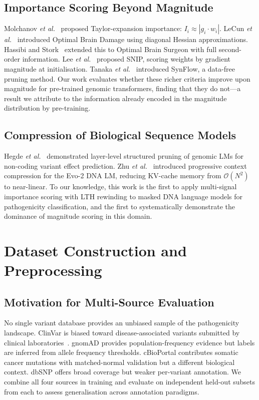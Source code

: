 \documentclass[journal]{IEEEtran}
\begin{document}
\subsection{Importance Scoring Beyond Magnitude}

Molchanov \emph{et al.}~\cite{Molchanov2017} proposed
Taylor-expansion importance: $I_i \approx |g_i \cdot w_i|$.
LeCun \emph{et al.}~\cite{LeCun1990} introduced Optimal Brain
Damage using diagonal Hessian approximations.
Hassibi and Stork~\cite{Hassibi1993} extended this to
Optimal Brain Surgeon with full second-order information.
Lee \emph{et al.}~\cite{Lee2019} proposed SNIP, scoring
weights by gradient magnitude at initialisation.
Tanaka \emph{et al.}~\cite{Tanaka2020} introduced SynFlow,
a data-free pruning method.
Our work evaluates whether these richer criteria improve upon
magnitude for pre-trained genomic transformers, finding that
they do not---a result we attribute to the information already
encoded in the magnitude distribution by pre-training.

\subsection{Compression of Biological Sequence Models}

Hegde \emph{et al.}~\cite{Hegde2025} demonstrated layer-level
structured pruning of genomic LMs for non-coding variant
effect prediction.
Zhu \emph{et al.}~\cite{Zhu2025} introduced progressive
context compression for the Evo-2 DNA LM, reducing KV-cache
memory from $\mathcal{O}(N^2)$ to near-linear.
To our knowledge, this work is the first to apply multi-signal
importance scoring with LTH rewinding to masked DNA language
models for pathogenicity classification, and the first to
systematically demonstrate the dominance of magnitude
scoring in this domain.


\section{Dataset Construction and Preprocessing}
\label{sec:data}

\subsection{Motivation for Multi-Source Evaluation}

No single variant database provides an unbiased sample of
the pathogenicity landscape.
ClinVar is biased toward disease-associated variants submitted
by clinical laboratories~\cite{Harrison2019}.
gnomAD provides population-frequency evidence but labels are
inferred from allele frequency thresholds.
cBioPortal contributes somatic cancer mutations with matched-normal
validation but a different biological context.
dbSNP offers broad coverage but weaker per-variant annotation.
We combine all four sources in training and evaluate on
independent held-out subsets from each to assess generalisation
across annotation paradigms.
\end{document}
